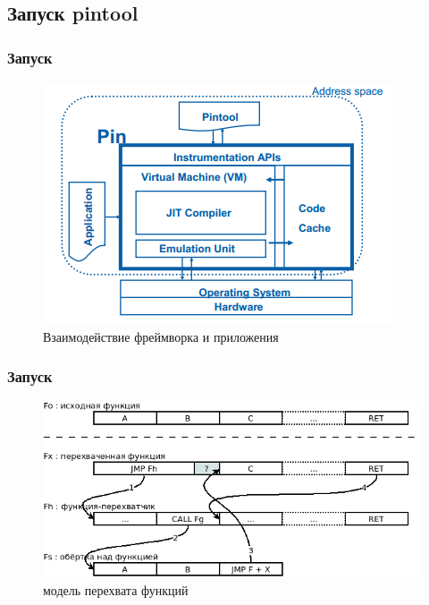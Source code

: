 \documentclass{beamer}
\begin{document}
\subsection{Запуск pintool}

\begin{frame}
\frametitle{Запуск}

\begin{figure}
\includegraphics[scale=1]{302144}
\caption{Взаимодействие фреймворка и приложения}
\end{figure}

\end{frame}


\begin{frame}
\frametitle{Запуск}

\begin{figure}
\includegraphics[scale=0.6]{394151}
\caption{модель перехвата функций}
\end{figure}

\end{frame}

\end{document}
